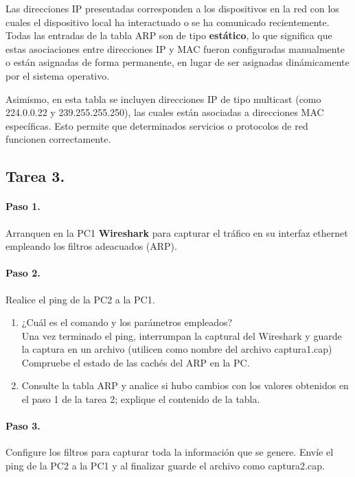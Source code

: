 \begin{enumerate}
            Las direcciones IP presentadas corresponden a los dispositivos en la red con los cuales el dispositivo local ha interactuado o se ha comunicado recientemente. Todas las entradas de la tabla ARP son de tipo \textbf{estático}, lo que significa que estas asociaciones entre direcciones IP y MAC fueron configuradas manualmente o están asignadas de forma permanente, en lugar de ser asignadas dinámicamente por el sistema operativo.
            
            Asimismo, en esta tabla se incluyen direcciones IP de tipo multicast (como 224.0.0.22 y 239.255.255.250), las cuales están asociadas a direcciones MAC específicas. Esto permite que determinados servicios o protocolos de red funcionen correctamente.

            
        \end{enumerate}
        
    \subsection{Tarea 3.}
    \paragraph{Paso 1.}
    Arranquen en la PC1 \textbf{Wireshark} para capturar el tráfico en su interfaz ethernet empleando los filtros adeacuados (ARP).
    \paragraph{Paso 2.}
    Realice el ping de la PC2 a la PC1.
    \begin{enumerate}
        \item ¿Cuál es el comando y los parámetros empleados?\\
        Una vez terminado el ping, interrumpan la captural del Wireshark y guarde la captura en un archivo (utilicen como nombre del archivo captura1.cap)
        Compruebe el estado de las cachés del ARP en la PC.
        \item Consulte la tabla ARP y analice si hubo cambios con los valores obtenidos en el paso 1 de la tarea 2; explique el contenido de la tabla.
    \end{enumerate}
    \paragraph{Paso 3.}
    Configure los filtros para capturar toda la información que se genere. Envíe el ping de la PC2 a la PC1 y al finalizar guarde el archivo como captura2.cap.
